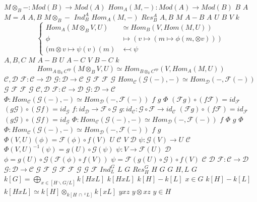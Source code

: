 \documentclass{article}
\begin{document}
$M \otimes_B-:Mod(B) \rightarrow Mod(A)$
$Hom_A(M,-):Mod(A) \rightarrow Mod(B)$
$B$
$A$
$M=A$
$A,B$
$M \otimes_B -$
$Ind_B^A$
$Hom_A(M,-)$
$Res_B^A$
$A,B$
$M$
$A-B$
$A$
$U$
$B$
$V$
$k$
$$
\begin{cases}
Hom_A(M\otimes_BV,U) &\simeq Hom_B(V,Hom(M,U))\\
\phi &\mapsto (v\mapsto(m\mapsto \phi(m,\otimes v)))\\
(m \otimes v \mapsto \psi(v)(m) &\leftarrowtail \psi
\end{cases}
$$
$A,B,C$
$M$
$A-B$
$U$
$A-C$
$V$
$B-C$
$k$
$$Hom_{A \otimes_k C^{op}}(M \otimes_B V, U) \simeq Hom_{B \otimes_k C^{op}}(V,Hom_A(M,U))$$
$\mathcal{C},\mathcal{D}$
$\mathcal{F}: \mathcal{C} \rightarrow \mathcal{D}$
$\mathcal{G}: \mathcal{D} \rightarrow \mathcal{C}$
$\mathcal{G}$
$\mathcal{F}$
$\mathcal{F}$
$\mathcal{G}$
$Hom_\mathcal{C}(\mathcal{G}(-),-) \simeq Hom_{\mathcal{D}}(-,\mathcal{F}(-))$
$\mathcal{G}$
$\mathcal{F}$
$\mathcal{F}$
$\mathcal{G}$
$\mathcal{C},\mathcal{D}$
$\mathcal{F} :\mathcal{C} \rightarrow \mathcal{D}$
$\mathcal{G}: \mathcal{D} \rightarrow \mathcal{C}$
$\Phi: Hom_{\mathcal{C}}(\mathcal{G}(-),-) \simeq Hom_{\mathcal{D}}(-,\mathcal{F}(-))$
$f$
$g$
$\Phi$
$(\mathcal{F}g)\circ (f\mathcal{F})= id_{\mathcal{F}}$
$(g \mathcal{G})\circ (\mathcal{G} f)=id_{\mathcal{G}}$
$f:id_{\mathcal{D}} \rightarrow \mathcal{F} \circ \mathcal{G}$
$g:id_{\mathcal{C}}:\mathcal{G}\circ \mathcal{F} \rightarrow id_{\mathcal{C}}$
$(\mathcal{F}g)\circ (f\mathcal{F})= id_{\mathcal{F}}$
$(g \mathcal{G})\circ (\mathcal{G} f)=id_{\mathcal{G}}$
$\Phi: Hom_{\mathcal{C}}(\mathcal{G}(-),-) \simeq Hom_{\mathcal{D}}(-,\mathcal{F}(-))$
$f$
$\Phi$
$g$
$\Phi$
$\Phi: Hom_{\mathcal{C}}(\mathcal{G}(-),-) \simeq Hom_{\mathcal{D}}(-,\mathcal{F}(-))$
$f$
$g$
$\Phi(V,U)(\phi) = \mathcal{F}(\phi) \circ f(V)$
$U$
$\mathcal{C}$
$V$
$\mathcal{D}$
$\psi:\mathcal{G}(V) \rightarrow U$
$\mathcal{C}$
$\Phi(V,U)^{-1}(\psi)=g(U)\circ \mathcal{G}(\psi)$
$\psi:V \rightarrow \mathcal{F}(U)$
$\mathcal{D}$
$\phi=g(U)\circ \mathcal{G}(\mathcal{F}(\phi)\circ f(V))$
$\psi=\mathcal{F}(g(U) \circ \mathcal{G}) \circ f(V)$
$\mathcal{C}$
$\mathcal{D}$
$\mathcal{F}:\mathcal{C} \rightarrow \mathcal{D}$
$\mathcal{G}:\mathcal{D} \rightarrow \mathcal{C}$
$\mathcal{G}$
$\mathcal{F}$
$\mathcal{G}$
$\mathcal{F}$
$\mathcal{F}$
$\mathcal{G}$
$\mathcal{G}$
$\mathcal{F}$
$Ind_L^G$
$L$
$G$
$Res_H^G$
$H$
$G$
$G$
$H,L$
$G$
$k[G]=\bigoplus_{x\in [H\backslash G / L]} k[HxL]$
$k[HxL]$
$k[H]-k[L]$
$x \in G$
$k[H]-k[L]$
$k[HxL] \simeq k[H]\otimes_{k[H \,\cap \,^xL]}k[xL]$
$yxz$
$y \otimes xz$
$y \in H$
\end{document}
